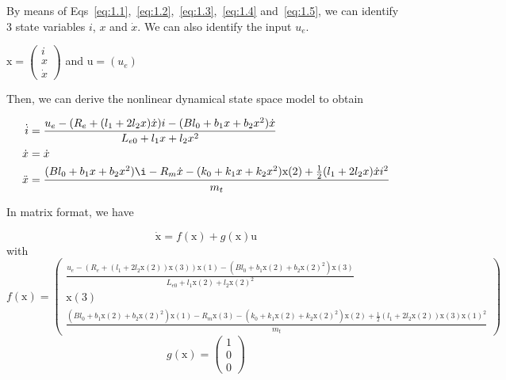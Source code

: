 By means of Eqs~\ref{eq:1.1},~\ref{eq:1.2},~\ref{eq:1.3},~\ref{eq:1.4} and~\ref{eq:1.5}, we can identify 3 state variables $i$, $x$ and $\dot{x}$. We can also identify the input $u_e$.

$\text{x}=\begin{pmatrix}
   i\\
   x \\
	 \dot{x}
\end{pmatrix}$ and $\text{u}=(u_e)$

Then, we can derive the nonlinear dynamical state space model to obtain

\begin{align}
   \dot{i} &= \frac{u_e-(R_e+(l_1+2l_2x)\dot{x})i-(Bl_0+b_1x+b_2x^2)\dot{x}}{L_{e0}+l_1x+l_2x^2}\\
   \dot{x} &= \dot{x}\\
	 \ddot{x} &= \frac{(Bl_0+b_1x+b_2x^2)\i-R_m\dot{x}-(k_0+k_1x+k_2x^2)\text{x}(2)+\frac{1}{2}(l_1+2l_2x)\dot{x}i^2}{m_t}
\end{align}

In matrix format, we have

\begin{equation}
	\label{eq:eqModel}
	\dot{\text{x}}=f(\text{x})+g(\text{x})\text{u}
\end{equation}
with
\begin{equation}
	\label{eq:f(x)}
	f(\text{x})=\begin{pmatrix}
   \frac{u_e-(R_e+(l_1+2l_2\text{x}(2))\text{x}(3))\text{x}(1)-(Bl_0+b_1\text{x}(2)+b_2\text{x}(2)^2)\text{x}(3)}{L_{e0}+l_1\text{x}(2)+l_2\text{x}(2)^2}\\
   \text{x}(3) \\
	 \frac{(Bl_0+b_1\text{x}(2)+b_2\text{x}(2)^2)\text{x}(1)-R_m\text{x}(3)-(k_0+k_1\text{x}(2)+k_2\text{x}(2)^2)\text{x}(2)+\frac{1}{2}(l_1+2l_2\text{x}(2))\text{x}(3)\text{x}(1)^2}{m_t}
\end{pmatrix}
\end{equation}
\begin{equation}
	\label{eq:g(u)}
	g(\text{x})=\begin{pmatrix}
   1\\
   0 \\
	 0
\end{pmatrix}
\end{equation}
